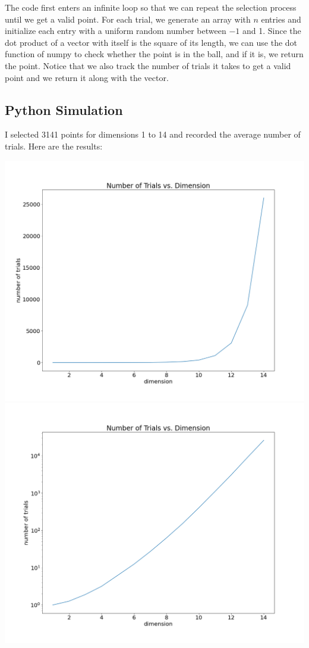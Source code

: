 \documentclass{article}
\begin{document}
The code first enters an infinite loop so that we can repeat the selection process until we get a valid point. For each trial, we generate an array with $n$ entries and initialize each entry with a uniform random number between $-1$ and 1. Since the dot product of a vector with itself is the square of its length, we can use the dot function of numpy to check whether the point is in the ball, and if it is, we return the point. Notice that we also track the number of trials it takes to get a valid point and we return it along with the vector.

\subsection{Python Simulation}

I selected 3141 points for dimensions 1 to 14 and recorded the average number of trials. Here are the results:

\begin{center}
    \includegraphics[scale=0.3]{manim/project/images/Trials vs. Dimension Linear.png}
    \includegraphics[scale=0.3]{manim/project/images/Trials vs. Dimension Log.png}
\end{center}
\end{document}
